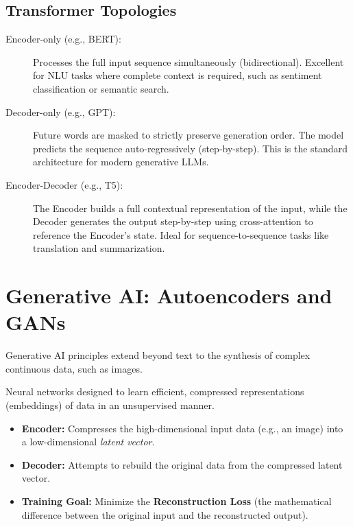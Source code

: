 \subsection*{Transformer Topologies}
\begin{description}
    \item[Encoder-only (e.g., BERT):] Processes the full input sequence simultaneously (bidirectional). Excellent for NLU tasks where complete context is required, such as sentiment classification or semantic search.
    \item[Decoder-only (e.g., GPT):] Future words are masked to strictly preserve generation order. The model predicts the sequence auto-regressively (step-by-step). This is the standard architecture for modern generative LLMs.
    \item[Encoder-Decoder (e.g., T5):] The Encoder builds a full contextual representation of the input, while the Decoder generates the output step-by-step using cross-attention to reference the Encoder's state. Ideal for sequence-to-sequence tasks like translation and summarization.
\end{description}

\section*{Generative AI: Autoencoders and GANs}

Generative AI principles extend beyond text to the synthesis of complex continuous data, such as images.

\begin{definition}[Autoencoders]
Neural networks designed to learn efficient, compressed representations (embeddings) of data in an unsupervised manner.
\begin{itemize}
    \item \textbf{Encoder:} Compresses the high-dimensional input data (e.g., an image) into a low-dimensional \textit{latent vector}.
    \item \textbf{Decoder:} Attempts to rebuild the original data from the compressed latent vector.
    \item \textbf{Training Goal:} Minimize the \textbf{Reconstruction Loss} (the mathematical difference between the original input and the reconstructed output).
\end{itemize}
\end{definition}

